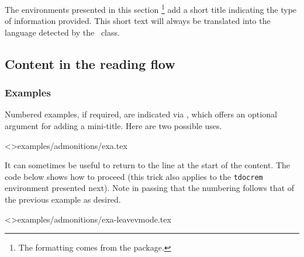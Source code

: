 \begin{tdocnote}
    The environments presented in this section
    \footnote{
        The formatting comes from the  package.
    }
    add a short title indicating the type of information provided.
    This short text will always be translated into the language detected by the \thisproj\ class.
\end{tdocnote}


\subsection{Content in the reading flow}








\subsubsection{Examples}

Numbered examples, if required, are indicated via , which offers an optional argument for adding a mini-title.
Here are two possible uses.

\tdoclatexinput<>{examples/admonitions/exa.tex}




\begin{tdoctip}
    It can sometimes be useful to return to the line at the start of the content. The code below shows how to proceed (this trick also applies to the \verb#tdocrem# environment presented next). Note in passing that the numbering follows that of the previous example as desired.
\end{tdoctip}

\tdoclatexinput<>{examples/admonitions/exa-leavevmode.tex}



